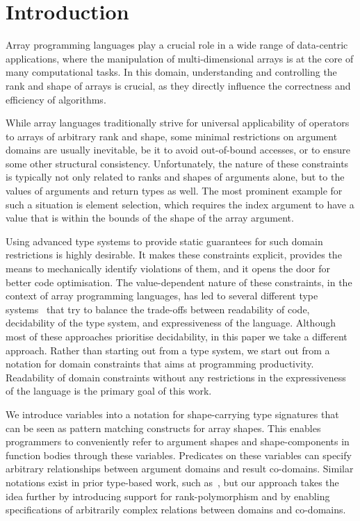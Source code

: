 
\newcommand{\sachome}{\url{https://sac-home.org}}
\newcommand{\stdlib}{\url{https://github.com/SacBase/Stdlib}}

\section{Introduction}

Array programming languages play a crucial role in a wide range of data-centric applications, where the manipulation of multi-dimen\-sional arrays is at the core of many computational tasks.
In this domain, understanding and controlling the rank and shape of arrays is crucial, as they directly influence the correctness and efficiency of algorithms.

While array languages traditionally strive for universal applicability of operators to arrays of arbitrary rank and shape, some minimal restrictions on argument domains are usually inevitable, be it to avoid out-of-bound accesses, or to ensure some other structural consistency.
Unfortunately, the nature of these constraints is typically not only related to ranks and shapes of arguments alone, but to the values of arguments and return types as well.
The most prominent example for such a situation is element selection, which requires the index argument to have a value that is within the bounds of the shape of the array argument.

Using advanced type systems to provide static guarantees for such domain restrictions is highly desirable.
It makes these constraints explicit, provides the means to mechanically identify violations of them, and it opens the door for better code optimisation.
The value-dependent nature of these constraints, in the context of array programming languages, has led to several different type systems~\cite{indexed, cube, dependent-types, futhark-size-parameters, remora} that try to balance the trade-offs between readability of code, decidability of the type system, and expressiveness of the language.
Although most of these approaches prioritise decidability, in this paper we take a different approach.
Rather than starting out from a type system, we start out from a notation for domain constraints that aims at programming productivity.
Readability of domain constraints without any restrictions in the expressiveness of the language is the primary goal of this work.

We introduce variables into a notation for shape-carrying type signatures that can be seen as pattern matching constructs for array shapes.
This enables programmers to conveniently refer to argument shapes and shape-components in function bodies through these variables.
Predicates on these variables can specify arbitrary relationships between argument domains and result co-domains.
Similar notations exist in prior type-based work, such as~\cite{dependent-types, futhark-size-parameters}, but our approach takes the idea further by introducing support for rank-polymorphism and by enabling specifications of arbitrarily complex relations between domains and co-domains.

